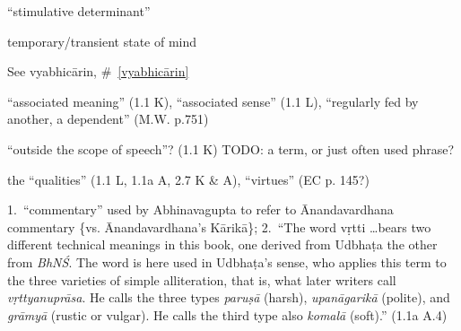 \documentclass[10pt]{article}
\begin{document}
\begin{multicols}{2}
\begin{enumerate}
\begin{enumerate}
			 ``stimulative determinant''
		\end{enumerate}

		 temporary/transient state of mind

		 See vyabhicārin, \#~\ref{vyabhicārin}




		 ``associated meaning'' (1.1 K), ``associated sense'' (1.1 L), ``regularly fed by another, a dependent'' (M.W. p.751)



		 ``outside the scope of speech''? (1.1 K) TODO: a term, or just often used phrase?

		 the ``qualities'' (1.1 L, 1.1a A, 2.7 K \& A), ``virtues'' (EC p. 145?)



		 1.\ ``commentary'' used by Abhinavagupta to refer to Ānandavardhana commentary \{vs. Ānandavardhana's Kārikā\};
		2.\ ``The word vṛtti \dots bears two different technical meanings in this book, one derived from Udbhaṭa the other from \textit{BhNŚ}. The word is here used in Udbhaṭa's sense, who applies this term to the three varieties of simple alliteration, that is, what later writers call \textit{vṛttyanuprāsa}. He calls the three types \textit{paruṣā} (harsh), \textit{upanāgarikā} (polite), and \textit{grāmyā} (rustic or vulgar). He calls the third type also \textit{komalā} (soft).'' (1.1a A.4)


\end{enumerate}
\end{multicols}
\end{document}
